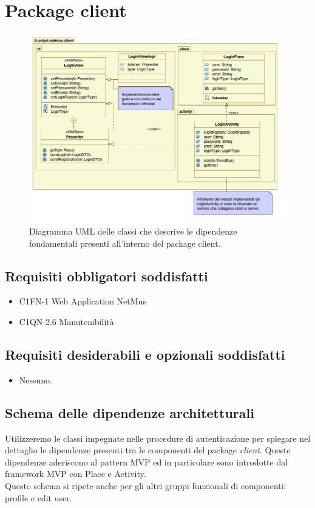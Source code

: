 \newpage
\section{Package client}

\begin{figure}[!h]
  \centering
  \includegraphics[width=14cm]{img/DP/package.png}
\caption{Diagramma UML delle classi che descrive le dipendenze
fondamentali presenti all'interno del package client.}
\end{figure}

\subsection*{Requisiti obbligatori soddisfatti}
\begin{itemize}
	\item C1FN-1 Web Application NetMus
	\item C1QN-2.6 Manutenibilit\`a
\end{itemize}
\subsection*{Requisiti desiderabili e opzionali soddisfatti}
\begin{itemize}
    \item Nessuno.
\end{itemize}
\subsection*{Schema delle dipendenze architetturali}
Utilizzeremo le classi impegnate nelle procedure di autenticazione per spiegare
nel dettaglio le dipendenze presenti tra le componenti del package
\emph{client}. 
Queste dipendenze aderiscono al pattern MVP ed in particolare sono introdotte
dal framework MVP con Place e Activity.\\
Questo schema si ripete anche per gli altri gruppi funzionali di componenti:
profile e edit user.


